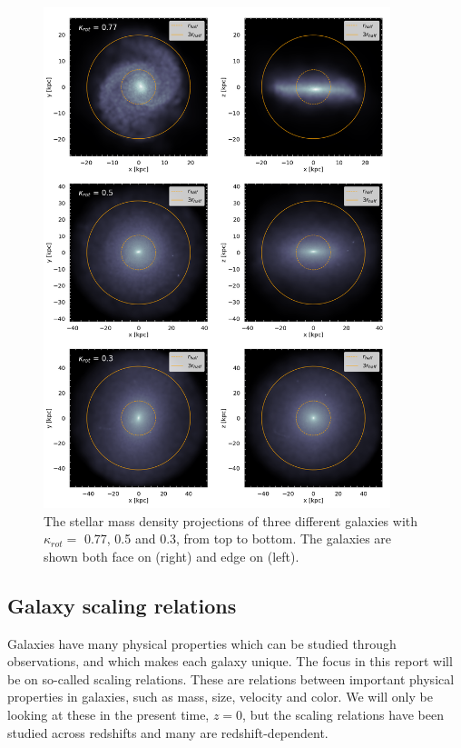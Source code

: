 \begin{figure}
    \centering
    \includegraphics[width=0.9\textwidth]{images/kappa_rot.png}
    \caption{The stellar mass density projections of three different galaxies with $\kappa_{rot} =$ 0.77, 0.5 and 0.3, from top to bottom. The galaxies are shown both face on (right) and edge on (left).}
    \label{kappa_rot}
\end{figure}

\subsection{Galaxy scaling relations}
Galaxies have many physical properties which can be studied through observations, and which makes each galaxy unique. The focus in this report will be on so-called scaling relations. These are relations between important physical properties in galaxies, such as mass, size, velocity and color. We will only be looking at these in the present time, $z=0$, but the scaling relations have been studied across redshifts and many are redshift-dependent.

